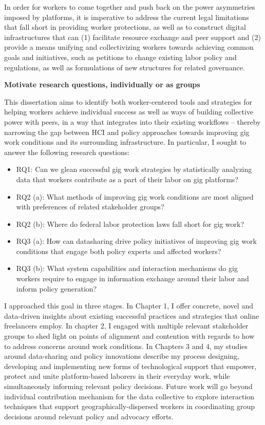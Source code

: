 In order for workers to come together and push back on the power asymmetries imposed by platforms, it is imperative to address the current legal limitations that fall short in providing worker protections, as well as to construct digital infrastructures that can (1) facilitate resource exchange and peer support and (2) provide a means unifying and collectivizing workers towards achieving common goals and initiatives, such as petitions to change existing labor policy and regulations, as well as formulations of new structures for related governance. 

\textbf{Motivate research questions, individually or as groups}

This dissertation aims to identify both worker-centered tools and strategies for helping workers achieve individual success as well as ways of building collective power with peers, in a way that integrates into their existing workflows -- thereby narrowing the gap between HCI and policy approaches towards improving gig work conditions and its surrounding infrastructure. In particular, I sought to answer the following research questions:

\begin{itemize}
    \item RQ1: Can we glean successful gig work strategies by statistically analyzing data that workers contribute as a part of their labor on gig platforms? \cite{personal} 
    \item RQ2 (a): What methods of improving gig work conditions are most aligned with preferences of related stakeholder groups? \cite{alternatives}
    \item RQ2 (b): Where do federal labor protection laws fall short for gig work? \cite{individualized}
    \item RQ3 (a): How can datasharing drive policy initiatives of improving gig work conditions that engage both policy experts and affected workers? \cite{supporting}
    \item RQ3 (b): What system capabilities and interaction mechanisms do gig workers require to engage in information exchange around their labor and inform policy generation? \cite{gig2gether}
\end{itemize}

I approached this goal in three stages. In Chapter 1, I offer concrete, novel and data-driven insights about existing successful practices and strategies that online freelancers employ. In chapter 2, I engaged with multiple relevant stakeholder groups to shed light on points of alignment and contention with regards to how to address concerns around work conditions. In Chapters 3 and 4, my studies around data-sharing and policy innovations describe my process designing, developing and implementing new forms of technological support that empower, protect and unite platform-based laborers in their everyday work, while simultaneously informing relevant policy decisions. Future work will go beyond individual contribution mechanism for the data collective to explore interaction techniques that support geographically-dispersed workers in coordinating group decisions around relevant policy and advocacy efforts.
